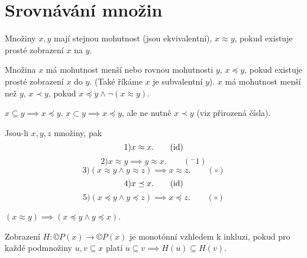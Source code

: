 \documentclass[12pt]{article}                   %
\begin{document}
\section{Srovnávání množin}
    \begin{definice}
        Množiny $x, y$ mají stejnou mohutnost (jsou ekvivalentní), $x \approx y$, pokud existuje prosté zobrazení $x$ na $y$.
    \end{definice}


    \begin{definice}
        Množina $x$ má mohutnost menší nebo rovnou mohutnosti $y$, $x \preceq y$, pokud existuje prosté zobrazení $x$ do $y$. (Také říkáme $x$ je subvalentní $y$). $x$ má mohutnost menší než $y$, $x \prec y$, pokud $x \preceq y \land \neg(x \approx y)$.
    \end{definice}

    \begin{pozorovani}
        $x \subseteq y \implies x \preceq y$. $x \subset y \implies x \preceq y$, ale ne nutně $x \prec y$ (viz přirozená čísla).
    \end{pozorovani}

    \begin{lemma}
        Jsou-li $x, y, z$ množiny, pak
        $$ 1) x \approx x. \qquad (\operatorname{id}) $$
        $$ 2) x \approx y \implies y \approx x. \qquad (^-1) $$
        $$ 3) (x \approx y \land y \approx z) \implies x \approx z. \qquad (\circ) $$
        $$ 4) x \preceq x. \qquad (\operatorname{id}) $$
        $$ 5) (x \preceq y \land y \preceq z) \implies x \preceq z. \qquad (\circ) $$
    \end{lemma}

    \begin{pozorovani}
        $(x \approx y) \implies (x \preceq y \land y \preceq x)$.
    \end{pozorovani}

    \begin{definice}
        Zobrazení $H: ©P(x) \rightarrow ©P(x)$ je monotónní vzhledem k inkluzi, pokud pro každé podmnožiny $u, v \subseteq x$ platí $u \subseteq v \implies H(u) \subseteq H(v)$.
    \end{definice}
\end{document}

